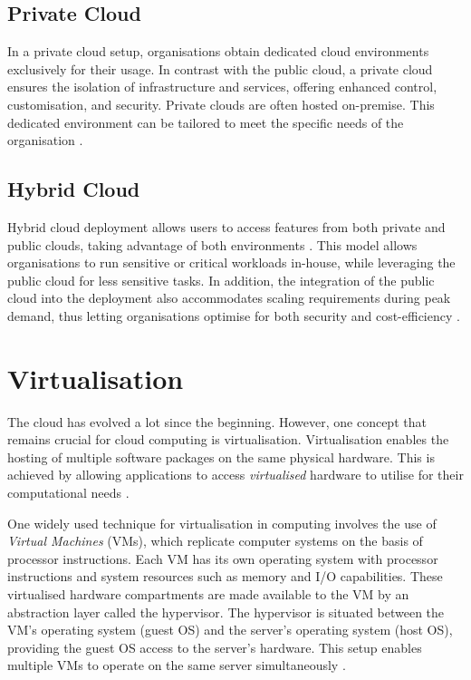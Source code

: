\subsection{Private Cloud}

In a private cloud setup, organisations obtain dedicated cloud environments exclusively for their usage. In contrast with the public cloud, a private cloud ensures the isolation of infrastructure and services, offering enhanced control, customisation, and security. Private clouds are often hosted on-premise. This dedicated environment can be tailored to meet the specific needs of the organisation \cite{ramgovind2010management}.

\subsection{Hybrid Cloud}

Hybrid cloud deployment allows users to access features from both private and public clouds, taking advantage of both environments \cite{ramgovind2010management, dash2016governance}. This model allows organisations to run sensitive or critical workloads in-house, while leveraging the public cloud for less sensitive tasks. In addition, the integration of the public cloud into the deployment also accommodates scaling requirements during peak demand, thus letting organisations optimise for both security and cost-efficiency \cite{huangAchievingBigData2014}.




\section{Virtualisation}

The cloud has evolved a lot since the beginning. However, one concept that remains crucial for cloud computing is virtualisation. Virtualisation enables the hosting of multiple software packages on the same physical hardware. This is achieved by allowing applications to access \textit{virtualised} hardware to utilise for their computational needs \cite{goldbergSurveyVirtualMachine1974}.

One widely used technique for virtualisation in computing involves the use of \textit{Virtual Machines} (VMs), which replicate computer systems on the basis of processor instructions. Each VM has its own operating system with processor instructions and system resources such as memory and I/O capabilities. These virtualised hardware compartments are made available to the VM by an abstraction layer called the hypervisor. The hypervisor is situated between the VM's operating system (guest OS) and the server's operating system (host OS), providing the guest OS access to the server's hardware. This setup enables multiple VMs to operate on the same server simultaneously \cite{goldbergSurveyVirtualMachine1974}.

